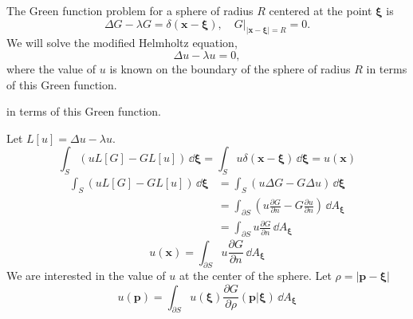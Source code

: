 {\begin{Solution}
The Green function problem for a sphere of radius $R$ centered at the point
$\boldsymbol{\xi}$ is
\begin{equation}
\label{eqn DG-lG=d, G=0}
\Delta G - \lambda G = \delta(\mathbf{x} - \boldsymbol{\xi}), \quad
G \big|_{|\mathbf{x} - \boldsymbol{\xi}| = R} = 0.
\end{equation}
We will solve the modified Helmholtz equation,
\[
\Delta u - \lambda u = 0,
\]
where the value of $u$ is known on the boundary of the sphere of 
radius $R$ in terms of this Green function.

in terms of this Green function.

Let $L[u] = \Delta u - \lambda u$.
\[
\int_S (u L[G] - G L[u]) \,\dd \boldsymbol{\xi}
= \int_S u \delta(\mathbf{x} - \boldsymbol{\xi}) \,\dd \boldsymbol{\xi}
= u(\mathbf{x})
\]
\begin{align*}
  \int_S (u L[G] - G L[u]) \,\dd \boldsymbol{\xi}
  &= \int_S (u \Delta G - G \Delta u) \,\dd \boldsymbol{\xi}
  \\
  &= \int_{\partial S} \left( u \frac{\partial G}{\partial n} - G \frac{\partial u}{\partial n} \right) \,\dd A_{\boldsymbol{\xi}}
  \\
  &= \int_{\partial S} u \frac{\partial G}{\partial n} \,\dd A_{\boldsymbol{\xi}}
\end{align*}
\[
u(\mathbf{x}) = \int_{\partial S} u \frac{\partial G}{\partial n} \,\dd A_{\boldsymbol{\xi}}
\]
We are interested in the value of $u$ at the center of the sphere.  
Let $\rho = |\mathbf{p} - \boldsymbol{\xi}|$
\[
u(\mathbf{p}) = \int_{\partial S} u(\boldsymbol{\xi}) 
\frac{\partial G}{\partial \rho}(\mathbf{p}|\boldsymbol{\xi}) \,\dd A_{\boldsymbol{\xi}}
\]


\end{Solution}}

